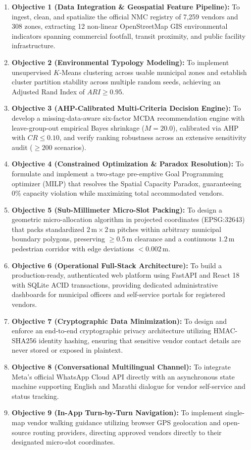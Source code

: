 \begin{enumerate}
    \item \textbf{Objective 1 (Data Integration \& Geospatial Feature Pipeline):} To ingest, clean, and spatialize the official NMC registry of 7,259 vendors and 308 zones, extracting 12 non-linear OpenStreetMap GIS environmental indicators spanning commercial footfall, transit proximity, and public facility infrastructure.
    \item \textbf{Objective 2 (Environmental Typology Modeling):} To implement unsupervised $K$-Means clustering across usable municipal zones and establish cluster partition stability across multiple random seeds, achieving an Adjusted Rand Index of $ARI \ge 0.95$.
    \item \textbf{Objective 3 (AHP-Calibrated Multi-Criteria Decision Engine):} To develop a missing-data-aware six-factor MCDA recommendation engine with leave-group-out empirical Bayes shrinkage ($M=20.0$), calibrated via AHP with $CR \le 0.10$, and verify ranking robustness across an extensive sensitivity audit ($\ge 200$ scenarios).
    \item \textbf{Objective 4 (Constrained Optimization \& Paradox Resolution):} To formulate and implement a two-stage pre-emptive Goal Programming optimizer (MILP) that resolves the Spatial Capacity Paradox, guaranteeing 0\% capacity violation while maximizing total accommodated vendors.
    \item \textbf{Objective 5 (Sub-Millimeter Micro-Slot Packing):} To design a geometric micro-allocation algorithm in projected coordinates (EPSG:32643) that packs standardized $2\,\text{m} \times 2\,\text{m}$ pitches within arbitrary municipal boundary polygons, preserving $\ge 0.5\,\text{m}$ clearance and a continuous $1.2\,\text{m}$ pedestrian corridor with edge deviations $< 0.002\,\text{m}$.
    \item \textbf{Objective 6 (Operational Full-Stack Architecture):} To build a production-ready, authenticated web platform using FastAPI and React 18 with SQLite ACID transactions, providing dedicated administrative dashboards for municipal officers and self-service portals for registered vendors.
    \item \textbf{Objective 7 (Cryptographic Data Minimization):} To design and enforce an end-to-end cryptographic privacy architecture utilizing HMAC-SHA256 identity hashing, ensuring that sensitive vendor contact details are never stored or exposed in plaintext.
    \item \textbf{Objective 8 (Conversational Multilingual Channel):} To integrate Meta's official WhatsApp Cloud API directly with an asynchronous state machine supporting English and Marathi dialogue for vendor self-service and status tracking.
    \item \textbf{Objective 9 (In-App Turn-by-Turn Navigation):} To implement single-map vendor walking guidance utilizing browser GPS geolocation and open-source routing providers, directing approved vendors directly to their designated micro-slot coordinates.
\end{enumerate}

